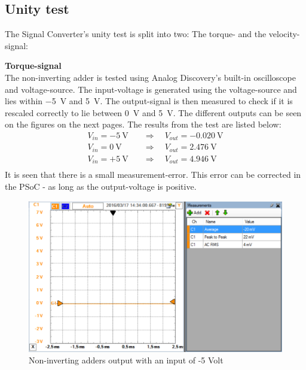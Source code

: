 \subsection{Unity test}
The Signal Converter's unity test is split into two: The torque- and the velocity-signal:

\textbf{Torque-signal}\\
The non-inverting adder is tested using Analog Discovery's built-in oscilloscope and voltage-source. The input-voltage is generated using the voltage-source and lies within \SI{-5}{\volt} and \SI{+5}{\volt}. The output-signal is then measured to check if it is rescaled correctly to lie between \SI{0}{\volt} and \SI{+5}{\volt}. The different outputs can be seen on the figures on the next pages. The results from the test are listed below:
\begin{equation}
	\begin{split}
		V_{in} = -\SI{5}{\volt} \quad &\Rightarrow \quad V_{out} = \SI{-0.020}{\volt}\\
		V_{in} = \SI{0}{\volt} \quad &\Rightarrow \quad V_{out} = \SI{2.476}{\volt}\\
		V_{in} = +\SI{5}{\volt} \quad &\Rightarrow \quad V_{out} = \SI{4.946}{\volt}\\
	\end{split}
\end{equation}
It is seen that there is a small measurement-error. This error can be corrected in the PSoC - as long as the output-voltage is positive.

\begin{figure}[H]
	\centering
	\includegraphics[width=0.9\linewidth]{Hardware/SignalConverter/Torque_test1}
	\caption{Non-inverting adders output with an input of -5 Volt}
	\label{fig:TorqueTest1}
\end{figure}

